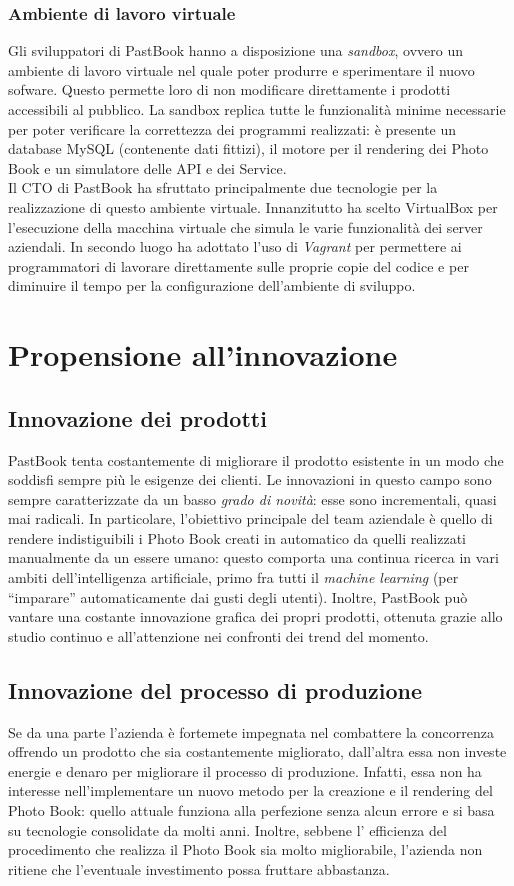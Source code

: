 			\subsubsection{Ambiente di lavoro virtuale}
				Gli sviluppatori di PastBook hanno a disposizione una \emph{sandbox}, ovvero un ambiente di lavoro virtuale nel
				quale poter produrre e sperimentare il nuovo sofware. Questo permette loro di non modificare direttamente i prodotti
				accessibili al pubblico. La sandbox replica tutte le funzionalità minime necessarie per poter verificare la
				correttezza dei programmi realizzati: è presente un database MySQL (contenente dati fittizi), il motore per il
				rendering dei Photo Book e un simulatore delle API e dei Service.\\
				Il CTO di PastBook ha sfruttato principalmente due tecnologie per la realizzazione di questo ambiente virtuale.
				Innanzitutto ha scelto VirtualBox per l'esecuzione della macchina virtuale che simula le varie funzionalità dei
				server aziendali. In secondo luogo ha adottato l'uso di \emph{Vagrant} per permettere ai programmatori di lavorare
				direttamente sulle proprie copie del codice e per diminuire il tempo per la configurazione dell'ambiente di
				sviluppo.
	\section{Propensione all'innovazione}
		\subsection{Innovazione dei prodotti}	
			PastBook tenta costantemente di migliorare il prodotto esistente in un modo che soddisfi sempre più le esigenze dei clienti.
			Le innovazioni in questo campo sono sempre caratterizzate da un basso \emph{grado di novità}: esse sono incrementali, quasi
			mai radicali. In particolare, l'obiettivo principale del team aziendale è quello di rendere indistiguibili i Photo Book
			creati in automatico da quelli realizzati manualmente da un essere umano: questo comporta una continua ricerca in vari
			ambiti dell'intelligenza artificiale, primo fra tutti il \emph{machine learning} (per “imparare” automaticamente dai gusti
			degli utenti). Inoltre, PastBook può vantare una costante innovazione grafica dei propri prodotti, ottenuta grazie allo
			studio continuo e all'attenzione nei confronti dei trend del momento.
		\subsection{Innovazione del processo di produzione}
			Se da una parte l'azienda è fortemete impegnata nel combattere la concorrenza offrendo un prodotto che sia costantemente
			migliorato, dall'altra essa non investe energie e denaro per migliorare il processo di produzione. Infatti, essa non ha
			interesse nell'implementare un nuovo metodo per la creazione e il rendering del Photo Book: quello attuale funziona alla
			perfezione senza alcun errore e si basa su tecnologie consolidate da molti anni. Inoltre, sebbene l' efficienza del
			procedimento che realizza il Photo Book sia molto migliorabile, l'azienda non ritiene che l'eventuale investimento possa
			fruttare abbastanza.
